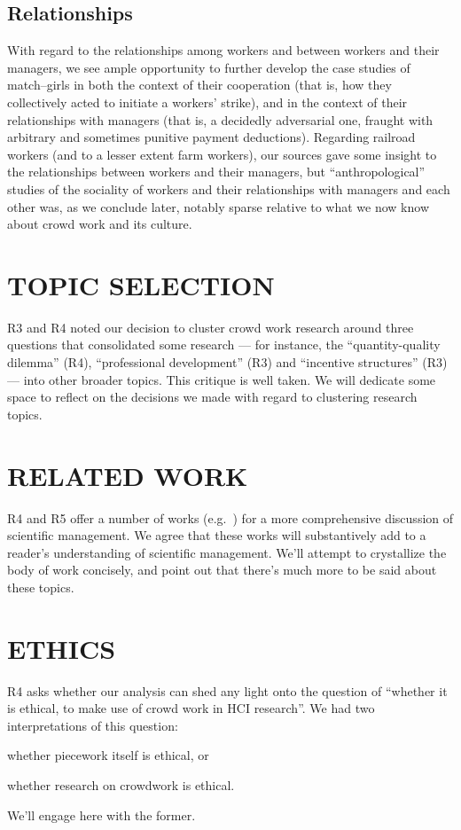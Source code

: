 \documentclass[11pt]{article}
\begin{document}
\subsection*{Relationships}
With regard to the relationships among workers and between workers and their managers,
we see ample opportunity to further develop the case studies of match--girls in both
the context of their cooperation
(that is, how they collectively acted to initiate a workers' strike), and
in the context of their relationships with managers
(that is, a decidedly adversarial one, fraught with
arbitrary and sometimes punitive payment deductions).
Regarding railroad workers (and to a lesser extent farm workers),
our sources gave some insight to the relationships between workers and their managers,
but ``anthropological'' studies of the sociality of workers and
their relationships with managers and each other was, as we conclude later,
notably sparse relative to what we now know about crowd work and its culture.




\section*{TOPIC SELECTION}
R3 and R4 noted our decision to cluster crowd work research around three questions
that consolidated some research
--- for instance, the ``quantity-quality dilemma'' (R4), ``professional development'' (R3) and ``incentive structures'' (R3) --- into other broader topics.
This critique is well taken. We will dedicate some space to reflect on
the decisions we made with regard to clustering research topics.

\section*{RELATED WORK}
R4 and R5 offer a number of works
(e.g.~\citeauthor{williamson2016})
for a more comprehensive discussion of scientific management.
We agree that these works will
substantively add to a reader's understanding of scientific management.
We'll attempt to crystallize the body of work concisely, and
point out that there's much more to be said about these topics.

\section*{ETHICS}
R4 asks whether our analysis can shed any light onto the question of
``whether it is ethical, to make use of crowd work in HCI research''.
We had two interpretations of this question:
\begin{inlinelist}
  \item whether piecework itself is ethical, or
  \item whether research on crowdwork is ethical. 
\end{inlinelist}
We'll engage here with the former.
\end{document}
